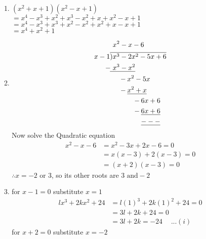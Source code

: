 \begin{multicols}{2}
\begin{enumerate}[label={\textbf{\arabic*.}}]
    \item $(x^2 + x + 1)(x^2 - x + 1)$ \\
        $ =  x^4 - x^3 + x ^2 + x^3 - x^2 + x + x^2 -x + 1$ \\
        $ =  x^4 - x^3 + x^3 + x ^2 - x^2 + x^2 + x  -x + 1$ \\
        $= x^4 + x^2 + 1$
    \item \begin{align*}
         & \hspace{ 4 pt} x ^2 - x -6 \\
        x -1 & \overline{) x^3 - 2x^2 - 5x + 6} \\
        -\hspace{-1pt} & \underline{ \hspace{4pt} x^ 3 - x^2} \\
        -\hspace{-23pt} & \hspace{25pt} x^2 - 5x  \\
       - \hspace{-23pt} &  \hspace{ 25pt} \underline{x^2 + x} \\
       - \hspace{-43pt} & \hspace{ 45pt} 6x + 6 \\
       - \hspace{-43pt} & \hspace{ 45pt} \underline{6x + 6}  \\
        & \hspace{ 45pt} \underline{---} 
    \end{align*}
   Now solve the Quadratic equation 
   \begin{align*} 
    x^2 - x - 6 &= x^2 - 3x + 2x - 6 = 0 \\
    &  = x(x - 3) + 2(x - 3) = 0 \\
    & =  (x + 2)(x - 3) = 0
   \end{align*}
   $\therefore x = -2 \text{ or } 3$, so its other roots are $3 \text{ and} -2$
    \item for $x-1 = 0$ substitute $x = 1$ 
    \begin{align*}
       lx^3 + 2kx^2 + 24 &= l(1)^3 + 2k(1)^2 + 24 = 0 \\
       & = 3l + 2k + 24 = 0 \\ 
       &= 3l + 2k = -24 \hspace{15pt}...(i)
    \end{align*}
    for $x+2 = 0$ substitute $x = -2$ 

\end{enumerate}
\end{multicols}
